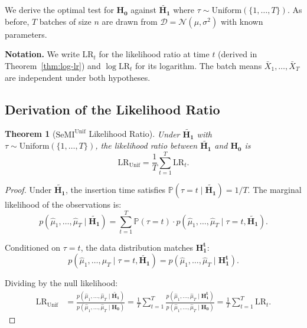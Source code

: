 \documentclass{article}
\theoremstyle{plain}
\newtheorem{theorem}{Theorem}[section]
\theoremstyle{definition}
\theoremstyle{remark}
\newcommand{\cN}{\ensuremath{\mathcal{N}}}
\newcommand{\cD}{\ensuremath{\mathcal{D}}}
\newcommand{\SeMIunif}{\mathrm{SeMI}^{\mathrm{Unif}}}
\newcommand{\bP}{\mathbb{P}}
\begin{document}
We derive the optimal test for $\mathbf{H_0}$ against $\widetilde{\mathbf{H_1}}$ where $\tau \sim \mathrm{Uniform}(\{1, \ldots, T\})$. As before, $T$ batches of size $n$ are drawn from $\cD = \cN(\mu, \sigma^2)$ with known parameters.

\textbf{Notation.} We write $\mathrm{LR}_t$ for the likelihood ratio at time $t$ (derived in Theorem~\ref{thm:log-lr}) and $\log \mathrm{LR}_t$ for its logarithm. The batch means $\bar{X}_1, \ldots, \bar{X}_T$ are independent under both hypotheses.

\subsection{Derivation of the Likelihood Ratio}
\label{app:uniform-lr-derivation}

\begin{theorem}[$\SeMIunif$ Likelihood Ratio]
    \label{thm:uniform-lr}
    Under $\widetilde{\mathbf{H_1}}$ with $\tau \sim \mathrm{Uniform}(\{1, \ldots, T\})$, the likelihood ratio between $\widetilde{\mathbf{H_1}}$ and $\mathbf{H_0}$ is
    \begin{equation*}
        \mathrm{LR}_{\mathrm{Unif}} = \frac{1}{T} \sum_{t=1}^{T} \mathrm{LR}_t.
    \end{equation*}
\end{theorem}

\begin{proof}
    Under $\widetilde{\mathbf{H_1}}$, the insertion time satisfies $\bP(\tau = t \mid \widetilde{\mathbf{H_1}}) = 1/T$. The marginal likelihood of the observations is:
    \begin{equation*}
        p(\hat{\mu}_1, \ldots, \hat{\mu}_T \mid \widetilde{\mathbf{H_1}}) = \sum_{t=1}^{T} \bP(\tau = t) \cdot p(\hat{\mu}_1, \ldots, \hat{\mu}_T \mid \tau = t, \widetilde{\mathbf{H_1}}).
    \end{equation*}

    Conditioned on $\tau = t$, the data distribution matches $\mathbf{H_1^t}$:
    \begin{equation*}
        p(\hat{\mu}_1, \ldots, \hat{\mu}_T \mid \tau = t, \widetilde{\mathbf{H_1}}) = p(\hat{\mu}_1, \ldots, \hat{\mu}_T \mid \mathbf{H_1^t}).
    \end{equation*}

    Dividing by the null likelihood:
    \begin{align*}
        \mathrm{LR}_{\mathrm{Unif}} & = \frac{p(\hat{\mu}_1, \ldots, \hat{\mu}_T \mid \widetilde{\mathbf{H_1}})}{p(\hat{\mu}_1, \ldots, \hat{\mu}_T \mid \mathbf{H_0})} = \frac{1}{T} \sum_{t=1}^{T} \frac{p(\hat{\mu}_1, \ldots, \hat{\mu}_T \mid \mathbf{H_1^t})}{p(\hat{\mu}_1, \ldots, \hat{\mu}_T \mid \mathbf{H_0})} = \frac{1}{T} \sum_{t=1}^{T} \mathrm{LR}_t.
    \end{align*}
\end{proof}
\end{document}
